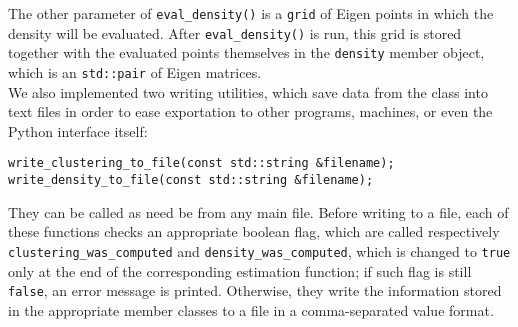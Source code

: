 The other parameter of \verb|eval_density()| is a \verb|grid| of Eigen points in which the density will be evaluated.
After \verb|eval_density()| is run, this grid is stored together with the evaluated points themselves in the \verb|density| member object, which is an \verb|std::pair| of Eigen matrices. \\[8pt]
We also implemented two writing utilities, which save data from the class into text files in order to ease exportation to other programs, machines, or even the Python interface itself:
\begin{verbatim}
write_clustering_to_file(const std::string &filename);
write_density_to_file(const std::string &filename);
\end{verbatim}
They can be called as need be from any main file.
Before writing to a file, each of these functions checks an appropriate boolean flag, which are called respectively \verb|clustering_was_computed| and \verb|density_was_computed|, which is changed to \verb|true| only at the end of the corresponding estimation function; if such flag is still \verb|false|, an error message is printed.
Otherwise, they write the information stored in the appropriate member classes to a file in a comma-separated value format.


